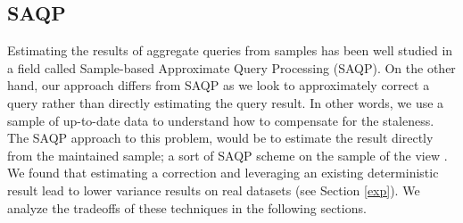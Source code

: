 \subsection{SAQP}
Estimating the results of aggregate queries from samples has been
well studied in a field called Sample-based Approximate Query Processing
(SAQP). On the other hand, our approach differs from SAQP as we look to
approximately correct a query rather than directly estimating the query result.
In other words, we use a sample of up-to-date data to understand how to compensate for the
staleness. The SAQP approach to this problem, would be to
estimate the result directly from the maintained sample; a sort of
SAQP scheme on the sample of the view \cite{joshi2008materialized}. We found that estimating
a correction and leveraging an existing deterministic result lead
to lower variance results on real datasets (see Section \ref{exp}). We analyze
the tradeoffs of these techniques in the following sections.


